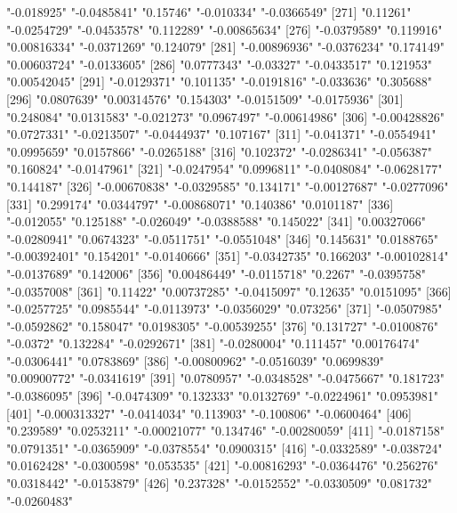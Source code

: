 \begin{Schunk}
\begin{Soutput}
[266] "-0.018925"    "-0.0485841"   "0.15746"      "-0.010334"    "-0.0366549"  
[271] "0.11261"      "-0.0254729"   "-0.0453578"   "0.112289"     "-0.00865634" 
[276] "-0.0379589"   "0.119916"     "0.00816334"   "-0.0371269"   "0.124079"    
[281] "-0.00896936"  "-0.0376234"   "0.174149"     "0.00603724"   "-0.0133605"  
[286] "0.0777343"    "-0.03327"     "-0.0433517"   "0.121953"     "0.00542045"  
[291] "-0.0129371"   "0.101135"     "-0.0191816"   "-0.033636"    "0.305688"    
[296] "0.0807639"    "0.00314576"   "0.154303"     "-0.0151509"   "-0.0175936"  
[301] "0.248084"     "0.0131583"    "-0.021273"    "0.0967497"    "-0.00614986" 
[306] "-0.00428826"  "0.0727331"    "-0.0213507"   "-0.0444937"   "0.107167"    
[311] "-0.041371"    "-0.0554941"   "0.0995659"    "0.0157866"    "-0.0265188"  
[316] "0.102372"     "-0.0286341"   "-0.056387"    "0.160824"     "-0.0147961"  
[321] "-0.0247954"   "0.0996811"    "-0.0408084"   "-0.0628177"   "0.144187"    
[326] "-0.00670838"  "-0.0329585"   "0.134171"     "-0.00127687"  "-0.0277096"  
[331] "0.299174"     "0.0344797"    "-0.00868071"  "0.140386"     "0.0101187"   
[336] "-0.012055"    "0.125188"     "-0.026049"    "-0.0388588"   "0.145022"    
[341] "0.00327066"   "-0.0280941"   "0.0674323"    "-0.0511751"   "-0.0551048"  
[346] "0.145631"     "0.0188765"    "-0.00392401"  "0.154201"     "-0.0140666"  
[351] "-0.0342735"   "0.166203"     "-0.00102814"  "-0.0137689"   "0.142006"    
[356] "0.00486449"   "-0.0115718"   "0.2267"       "-0.0395758"   "-0.0357008"  
[361] "0.11422"      "0.00737285"   "-0.0415097"   "0.12635"      "0.0151095"   
[366] "-0.0257725"   "0.0985544"    "-0.0113973"   "-0.0356029"   "0.073256"    
[371] "-0.0507985"   "-0.0592862"   "0.158047"     "0.0198305"    "-0.00539255" 
[376] "0.131727"     "-0.0100876"   "-0.0372"      "0.132284"     "-0.0292671"  
[381] "-0.0280004"   "0.111457"     "0.00176474"   "-0.0306441"   "0.0783869"   
[386] "-0.00800962"  "-0.0516039"   "0.0699839"    "0.00900772"   "-0.0341619"  
[391] "0.0780957"    "-0.0348528"   "-0.0475667"   "0.181723"     "-0.0386095"  
[396] "-0.0474309"   "0.132333"     "0.0132769"    "-0.0224961"   "0.0953981"   
[401] "-0.000313327" "-0.0414034"   "0.113903"     "-0.100806"    "-0.0600464"  
[406] "0.239589"     "0.0253211"    "-0.00021077"  "0.134746"     "-0.00280059" 
[411] "-0.0187158"   "0.0791351"    "-0.0365909"   "-0.0378554"   "0.0900315"   
[416] "-0.0332589"   "-0.038724"    "0.0162428"    "-0.0300598"   "0.053535"    
[421] "-0.00816293"  "-0.0364476"   "0.256276"     "0.0318442"    "-0.0153879"  
[426] "0.237328"     "-0.0152552"   "-0.0330509"   "0.081732"     "-0.0260483"  

\end{Soutput}
\end{Schunk}
